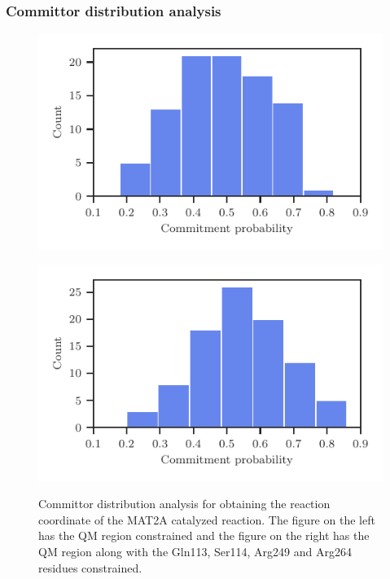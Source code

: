 \documentclass{beamer}
\begin{document}
\begin{frame}
\frametitle{Committor distribution analysis}
\begin{figure}[ht!]
\centering
\begin{minipage}[b]{0.45\linewidth}
\includegraphics[width=\textwidth]{figures/comm-60-mat2a-nocons.pdf}
\label{fig:minipage1}
\end{minipage}
\quad
\begin{minipage}[b]{0.45\linewidth}
\includegraphics[width=\textwidth]{figures/comm-60-mat2a.pdf}
\label{fig:minipage2}
\end{minipage}
\caption{Committor distribution analysis for obtaining the reaction coordinate of the 
MAT2A catalyzed reaction. The figure on the left has the QM region constrained and the figure 
on the right has the QM region along with the Gln113, Ser114, Arg249 and Arg264 residues constrained.}
\label{fig:mat2a-comm-dist}
\end{figure}
\end{frame}
\end{document}
